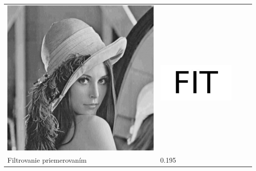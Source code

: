 \begin{table}[h]
\begin{tabular}{llcc}
\begin{minipage}[c]{.1\textwidth}
  \includegraphics[scale=0.1]{obrazky/medianFilter}
\end{minipage} &
\begin{minipage}[c]{.15\textwidth}
\ 
  \includegraphics[scale=0.25]{obrazky/medianFilter-wm}
\end{minipage} \\
Filtrovanie priemerovaním              & 0.195 &
\begin{minipage}[c]{.1\textwidth}
\ 

\end{minipage}
\end{tabular}
\end{table}

